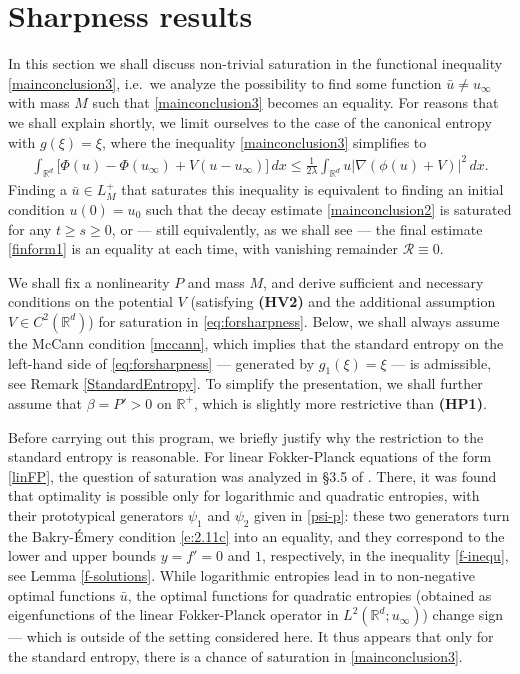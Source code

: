 \documentclass[reqno]{amsart}
\newcommand{\R}{\mathbb{R}}
\newcommand{\Rd}{{\R^d}}
\newcommand{\intRd}{{\int_\Rd}}
\begin{document}
\section{Sharpness results}\label{sec:sharp}
\setcounter{equation}{0}


In this section we shall discuss non-trivial saturation in the functional inequality \eqref{mainconclusion3}, i.e.\ we analyze the possibility to find some function $\bar u\ne u_\infty$ with mass $M$ such that \eqref{mainconclusion3} becomes an equality. For reasons that we shall explain shortly, we limit ourselves to the case of the canonical entropy with $g(\xi)=\xi$, where the inequality \eqref{mainconclusion3} simplifies to
\begin{align}
    \label{eq:forsharpness}
    \intRd \big[\Phi(u)-\Phi(u_\infty) + V(u-u_\infty)\big]\,dx
    \le \frac1{2\lambda} \intRd u\big|\nabla(\phi(u)+V)\big|^2\,dx.
\end{align}
Finding a $\bar u\in L_M^+$ that saturates this inequality is equivalent to finding an initial condition $u(0)=u_0$ such that the decay estimate \eqref{mainconclusion2} is saturated for any $t\ge s\ge0$, or --- still equivalently, as we shall see --- the final estimate \eqref{finform1} is an equality at each time, with vanishing remainder $\mathcal R\equiv0$.

We shall fix a nonlinearity $P$ and mass $M$, and derive sufficient and necessary conditions on the potential $V$ (satisfying {\bf (HV2)} and the additional assumption $V\in C^2(\R^d)$) for saturation in \eqref{eq:forsharpness}. Below, we shall always assume the McCann condition \eqref{mccann}, which implies that the standard entropy on the left-hand side of \eqref{eq:forsharpness} --- generated by $g_1(\xi)=\xi$ --- is admissible, see Remark \ref{StandardEntropy}. To simplify the presentation, we shall further assume that $\beta=P'>0$ on $\R^+$, which is slightly more restrictive than {\bf (HP1)}.

Before carrying out this program, we briefly justify why the restriction to the standard entropy is reasonable. For linear Fokker-Planck equations of the form \eqref{linFP}, the question of saturation was analyzed in \S3.5 of \cite{AMTU}. There, it was found that optimality is possible only for logarithmic and quadratic entropies, with their prototypical generators $\psi_1$ and $\psi_2$ given in \eqref{psi-p}: these two generators turn the Bakry-\'Emery condition \eqref{e:2.11c} into an equality, and they correspond to the lower and upper bounds $y=f'=0$ and $1$, respectively, in the inequality \eqref{f-inequ}, see Lemma \ref{f-solutions}. While logarithmic entropies lead in \cite{AMTU} to non-negative optimal functions $\bar u$, the optimal functions for quadratic entropies (obtained as eigenfunctions of the linear Fokker-Planck operator in $L^2(\R^d;u_\infty)$) change sign --- which is outside of the setting considered here. It thus appears that only for the standard entropy, there is a chance of saturation in \eqref{mainconclusion3}.
\end{document}
